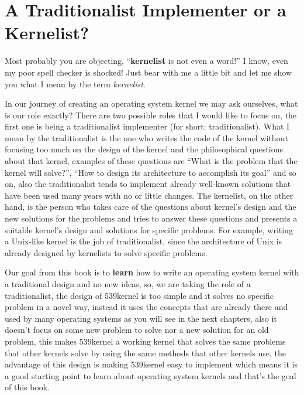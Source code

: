 \section{A Traditionalist Implementer or a
Kernelist?}\label{a-traditionalist-implementer-or-a-kernelist}

Most probably you are objecting, ``\textbf{kernelist} is not even a
word!'' I know, even my poor spell checker is shocked! Just bear with me
a little bit and let me show you what I mean by the term
\emph{kernelist}.

In our journey of creating an operating system kernel we may ask
ourselves, what is our role exactly? There are two possible roles that I
would like to focus on, the first one is being a traditionalist
implementer (for short: traditionalist). What I mean by the
traditionalist is the one who writes the code of the kernel without
focusing too much on the design of the kernel and the philosophical
questions about that kernel, examples of these questions are ``What is
the problem that the kernel will solve?'', ``How to design its
architecture to accomplish its goal'' and so on, also the traditionalist
tends to implement already well-known solutions that have been used many
years with no or little changes. The kernelist, on the other hand, is
the person who takes care of the questions about kernel's design and the
new solutions for the problems and tries to answer these questions and
presents a suitable kernel's design and solutions for specific problems.
For example, writing a Unix-like kernel is the job of traditionalist,
since the architecture of Unix is already designed by kernelists to
solve specific problems.

Our goal from this book is to \textbf{learn} how to write an operating
system kernel with a traditional design and no new ideas, so, we are
taking the role of a traditionalist, the design of 539kernel is too
simple and it solves no specific problem in a novel way, instead it uses
the concepts that are already there and used by many operating systems
as you will see in the next chapters, also it doesn't focus on some new
problem to solve nor a new solution for an old problem, this makes
539kernel a working kernel that solves the same problems that other
kernels solve by using the same methods that other kernels use, the
advantage of this design is making 539kernel easy to implement which
means it is a good starting point to learn about operating system
kernels and that's the goal of this book.


